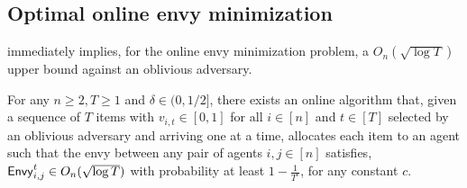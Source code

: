 





\subsection{Optimal online envy minimization}\label{subsec: envy for oblivious}


 immediately implies, for the online envy minimization problem, a $O_n(\sqrt{\log{T}})$ upper bound against an oblivious adversary.

\begin{corollary}\label{cor: main result for oblivious and fair division}
    For any $n \geq 2, T \geq 1$ and $\delta \in (0,1/2]$, there exists an online algorithm that, given a sequence of $T$ items with $v_{i,t} \in [0,1]$ for all $i \in [n]$ and $t \in [T]$ selected by an oblivious adversary and arriving one at a time, allocates each item to an agent such that the envy between any pair of agents $i,j \in [n]$ satisfies, $\mathsf{Envy}^t_{i,j} \in O_n(\sqrt{\log{T}})$ with probability at least $1 - \frac{1}{T^c}$, for any constant $c$.
\end{corollary}


